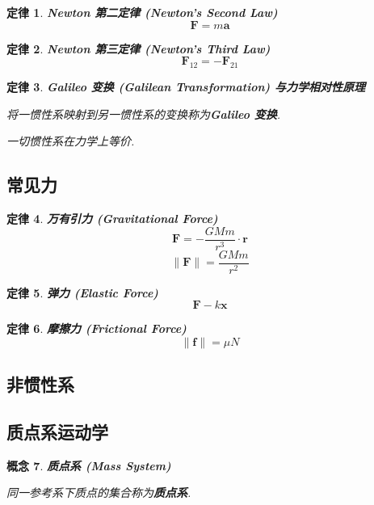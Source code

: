\documentclass[UTF8]{ctexart}
\newcommand{\<}{\langle}
\renewcommand{\>}{\rangle}                              %
\newenvironment{dfn_box}{
    \begin{tcolorbox}[enhanced, colback=dfn_green2, boxrule=0pt, frame hidden,
        borderline west={0.7mm}{0.1mm}{dfn_green1},breakable]
    }
    {\end{tcolorbox}}
\newenvironment{axm_box}{
    \begin{tcolorbox}[enhanced, colback=axm_yellow2, boxrule=0pt, frame hidden,
        borderline west={0.7mm}{0.1mm}{axm_yellow1},breakable]
    }
    {\end{tcolorbox}}
\theoremstyle{MyStyle} %
\newtheorem{definition}{概念}[subsection]
\newenvironment{cpt}{\begin{dfn_box}\begin{definition}}{\end{definition}\end{dfn_box}}
\newtheorem{axm}[definition]{定律}
\newenvironment{thr}{\begin{axm_box}\begin{axm}}{\end{axm}\end{axm_box}}
\begin{document}
        \begin{thr}
            \textbf{Newton 第二定律 (Newton's Second Law)}
            \[\bm{F}=m\bm{a}\]
        \end{thr}
        
        \begin{thr}
            \textbf{Newton 第三定律 (Newton's Third Law)}
            \[\bm{F}_{12}=-\bm{F}_{21}\]
        \end{thr}
        
        \begin{thr}
            \textbf{Galileo 变换 (Galilean Transformation) 与力学相对性原理}

            将一惯性系映射到另一惯性系的变换称为\textbf{Galileo 变换}. 

            一切惯性系在力学上等价. 
        \end{thr}

    \subsection{常见力}
        
        \begin{thr}
            \textbf{万有引力 (Gravitational Force)}
            \[\bm{F}=-\frac{GMm}{r^3}\cdot\bm{r}\]
            \[\|\bm{F}\|=\frac{GMm}{r^2}\]
        \end{thr}
        
        \begin{thr}
            \textbf{弹力 (Elastic Force)}
            \[\bm{F}-k\bm{x}\]
        \end{thr}
        
        \begin{thr}
            \textbf{摩擦力 (Frictional Force)}
            \[\|\bm{f}\|=\mu N\]
        \end{thr}

    \subsection{非惯性系}

    \subsection{质点系运动学}
        
        \begin{cpt}
            \textbf{质点系 (Mass System)}

            同一参考系下质点的集合称为\textbf{质点系}. 
        \end{cpt}
        
\end{document}

